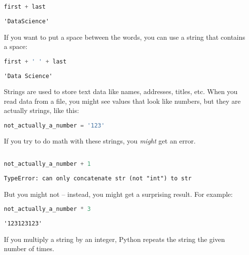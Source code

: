 \begin{lstlisting}[language=Python,style=source]
first + last
\end{lstlisting}

\begin{lstlisting}[style=output]
'DataScience'
\end{lstlisting}

If you want to put a space between the words, you can use a string that
contains a space:

\begin{lstlisting}[language=Python,style=source]
first + ' ' + last
\end{lstlisting}

\begin{lstlisting}[style=output]
'Data Science'
\end{lstlisting}

Strings are used to store text data like names, addresses, titles, etc.
When you read data from a file, you might see values that look like
numbers, but they are actually strings, like this:

\begin{lstlisting}[language=Python,style=source]
not_actually_a_number = '123'
\end{lstlisting}

If you try to do math with these strings, you \emph{might} get an error.

\begin{lstlisting}[language=Python,style=source]
%%expect TypeError

not_actually_a_number + 1
\end{lstlisting}

\begin{lstlisting}[style=output]
TypeError: can only concatenate str (not "int") to str
\end{lstlisting}

But you might not -- instead, you might get a surprising result. For
example:

\begin{lstlisting}[language=Python,style=source]
not_actually_a_number * 3
\end{lstlisting}

\begin{lstlisting}[style=output]
'123123123'
\end{lstlisting}

If you multiply a string by an integer, Python repeats the string the
given number of times.

